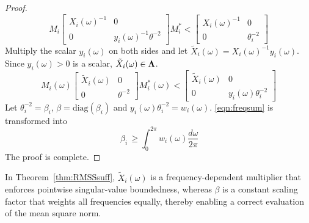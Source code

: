 \begin{proof}
\begin{equation*}
    M_i
    \left[
    \begin{array}{cc}
        X_i(\omega)^{-1} & 0 \\
        0 & y_i(\omega)^{-1} \theta^{-2}
    \end{array}\right]
    M_i^*<
    \left[
    \begin{array}{cc}
        X_i(\omega)^{-1} & 0 \\
        0 & \theta_i^{-2}
    \end{array}\right] 
\end{equation*}
Multiply the scalar $y_i(\omega)$ on both sides and let $\tilde{X}_i(\omega)= X_i(\omega)^{-1}y_i(\omega)$. Since $y_i(\omega)>0$ is a scalar, \(\tilde{X}_i(\omega)\in {\bf{\Lambda}}\).
\begin{equation}
    M_i(\omega)
    \left[
    \begin{array}{cc}
        \tilde{X}_i(\omega) & 0 \\
        0 & \theta^{-2}
    \end{array}\right]
    M_i^*(\omega)<
    \left[
    \begin{array}{cc}
        \tilde{X}_i(\omega) & 0 \\
        0 & y_i(\omega)\theta_i^{-2}
    \end{array}\right]
\end{equation}
Let $\theta_i^{-2}=\beta_i$, $\beta=\mathrm{diag}(\beta_i)$ and $y_i(\omega)\theta_i^{-2}=w_i(\omega)$. \eqref{eqn:freqsum} is transformed into 
\begin{equation}
   \,\beta_i\,\geq \int_0^{2\pi}w_i(\omega)\frac{d\omega}{2\pi}
\end{equation}
The proof is complete.
\end{proof}
In Theorem~\ref{thm:RMSSsuff}, $\tilde{X}_i(\omega)$ is a frequency-dependent multiplier that enforces pointwise singular-value boundedness, whereas $\beta$ is a constant scaling factor that weights all frequencies equally, thereby enabling a correct evaluation of the mean square norm.






